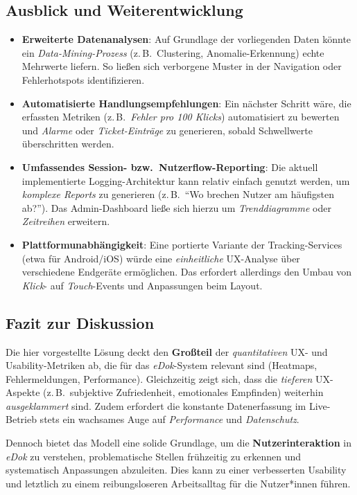 \documentclass[12pt,oneside]{article}
\begin{document}
\subsection{Ausblick und Weiterentwicklung}
\begin{itemize}
    \item \textbf{Erweiterte Datenanalysen}:
    Auf Grundlage der vorliegenden Daten könnte ein \emph{Data-Mining-Prozess} (z.\,B.\ Clustering, Anomalie-Erkennung) echte Mehrwerte liefern. So ließen sich verborgene Muster in der Navigation oder Fehlerhotspots identifizieren.
    \item \textbf{Automatisierte Handlungsempfehlungen}:
    Ein nächster Schritt wäre, die erfassten Metriken (z.\,B.\ \emph{Fehler pro 100 Klicks}) automatisiert zu bewerten und \emph{Alarme} oder \emph{Ticket-Einträge} zu generieren, sobald Schwellwerte überschritten werden. 
    \item \textbf{Umfassendes Session- bzw.\ Nutzerflow-Reporting}:
    Die aktuell implementierte Logging-Architektur kann relativ einfach genutzt werden, um \emph{komplexe Reports} zu generieren (z.\,B.\ \enquote{Wo brechen Nutzer am häufigsten ab?}). Das Admin-Dashboard ließe sich hierzu um \emph{Trenddiagramme} oder \emph{Zeitreihen} erweitern.
    \item \textbf{Plattformunabhängigkeit}:
    Eine portierte Variante der Tracking-Services (etwa für Android/iOS) würde eine \emph{einheitliche} UX-Analyse über verschiedene Endgeräte ermöglichen. Das erfordert allerdings den Umbau von \emph{Klick}- auf \emph{Touch}-Events und Anpassungen beim Layout.
\end{itemize}

\subsection{Fazit zur Diskussion}
Die hier vorgestellte Lösung deckt den \textbf{Großteil} der \emph{quantitativen} UX- und Usability-Metriken ab, die für das \textit{eDok}-System relevant sind (Heatmaps, Fehlermeldungen, Performance). Gleichzeitig zeigt sich, dass die \emph{tieferen} UX-Aspekte (z.\,B.\ subjektive Zufriedenheit, emotionales Empfinden) weiterhin \emph{ausgeklammert} sind. Zudem erfordert die konstante Datenerfassung im Live-Betrieb stets ein wachsames Auge auf \emph{Performance} und \emph{Datenschutz}. 

Dennoch bietet das Modell eine solide Grundlage, um die \textbf{Nutzerinteraktion} in \textit{eDok} zu verstehen, problematische Stellen frühzeitig zu erkennen und systematisch Anpassungen abzuleiten. Dies kann zu einer verbesserten Usability und letztlich zu einem reibungsloseren Arbeitsalltag für die Nutzer*innen führen. 


\printbibliography
 
\end{document}
